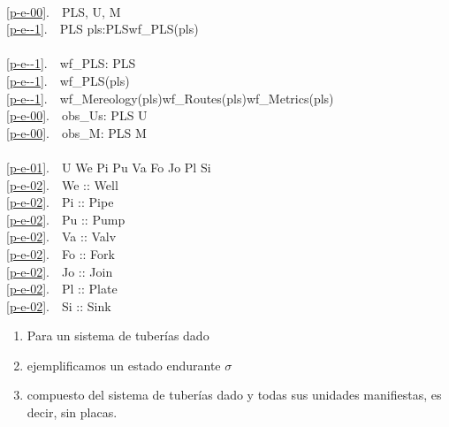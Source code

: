 \mnewfoil\LLLL
{}
\bp
{}\\
\ref{p-e-00}.\ \ PLS{\PRIM}, U, M \\
\ref{p-e--1}.\ \ PLS {\EQ} {\LBRACE}{\BAR} pls:PLS{\PRIM}{\RDOT}wf\_PLS(pls) {\BAR}{\RBRACE}  \\
\\
\ref{p-e--1}.\ \ wf\_PLS: PLS {\RIGHTARROW}  \\
\ref{p-e--1}.\ \ wf\_PLS(pls) {\IS}\\
\ref{p-e--1}.\ \ wf\_Mereology(pls){\WEDGE}wf\_Routes(pls){\WEDGE}wf\_Metrics(pls)\footnotemark\\
\ref{p-e-00}.\ \ obs\_Us: PLS {\RIGHTARROW} U \\
\ref{p-e-00}.\ \ obs\_M: PLS {\RIGHTARROW} M \\
\\
\ref{p-e-01}.\ \ U {\EQ} We {\BAR} Pi {\BAR} Pu {\BAR} Va {\BAR} Fo {\BAR} Jo {\BAR} Pl {\BAR} Si\\
\ref{p-e-02}.\ \ We :: Well\\
\ref{p-e-02}.\ \ Pi :: Pipe \\
\ref{p-e-02}.\ \ Pu :: Pump \\
\ref{p-e-02}.\ \ Va :: Valv\\
\ref{p-e-02}.\ \ Fo :: Fork\\
\ref{p-e-02}.\ \ Jo :: Join\\
\ref{p-e-02}.\ \ Pl :: Plate\\
\ref{p-e-02}.\ \ Si :: Sink
\ep
\tehrantutorial{\end{multicols}}{}



\begin{enumerate}\setei
\item \label{end-state-000} Para un sistema de tuberías dado %
\item \label{end-state-010} ejemplificamos un estado endurante $\sigma$
\item \label{end-state-020} compuesto del sistema de tuberías dado y
                            todas sus unidades manifiestas, es decir, sin placas.
\savei\end{enumerate}

